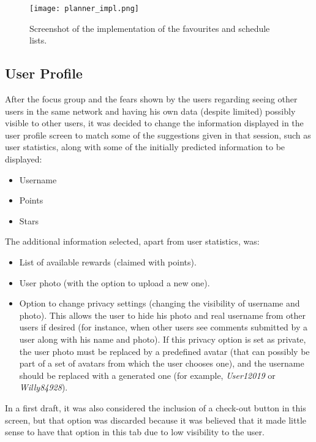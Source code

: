 \begin{figure}[h!]
  \begin{center}
    \leavevmode
    \texttt{[image: planner\_impl.png]}
    \caption{Screenshot of the implementation of the favourites and schedule lists.}
    \label{fig:planner_impl}
  \end{center}
\end{figure}

\newpage
\subsection{User Profile}\label{userprofileimpl}

After the focus group and the fears shown by the users regarding seeing other users in the same network and having his own data (despite limited) possibly visible to other users, it was decided to change the information displayed in the user profile screen to match some of the suggestions given in that session, such as user statistics, along with some of the initially predicted information to be displayed:

\begin{itemize}
\item Username
\item Points
\item Stars
\end{itemize}

The additional information selected, apart from user statistics, was:

\begin{itemize}
\item List of available rewards (claimed with points).
\item User photo (with the option to upload a new one).
\item Option to change privacy settings (changing the visibility of username and photo). This allows the user to hide his photo and real username from other users if desired (for instance, when other users see comments submitted by a user along with his name and photo). If this privacy option is set as private, the user photo must be replaced by a predefined avatar (that can possibly be part of a set of avatars from which the user chooses one), and the username should be replaced with a generated one (for example, \emph{User12019} or \emph{Willy84928}).
\end{itemize}

In a first draft, it was also considered the inclusion of a check-out button in this screen, but that option was discarded because it was believed that it made little sense to have that option in this tab due to low visibility to the user.

